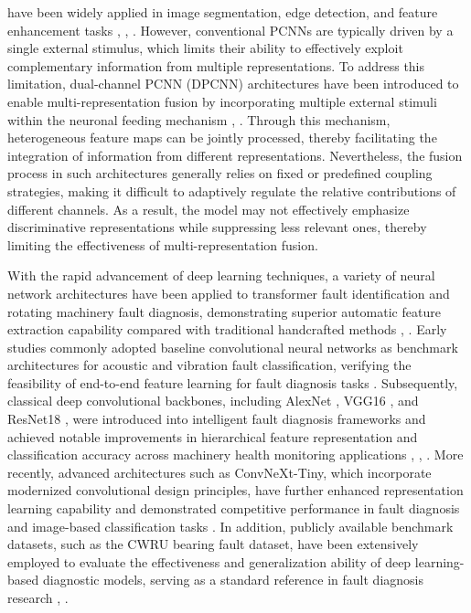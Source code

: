 \documentclass[journal]{IEEEtran}
\begin{document}
have been widely applied in image segmentation, edge detection, and feature enhancement tasks \cite{9444355}, \cite{10848019}, \cite{8746999}. However, conventional PCNNs are typically driven by a single external stimulus, which limits their ability to effectively exploit complementary information from multiple representations. To address this limitation, dual-channel PCNN (DPCNN) architectures have been introduced to enable multi-representation fusion by incorporating multiple external stimuli within the neuronal feeding mechanism \cite{4344292}, \cite{10341267}. Through this mechanism, heterogeneous feature maps can be jointly processed, thereby facilitating the integration of information from different representations. Nevertheless, the fusion process in such architectures generally relies on fixed or predefined coupling strategies, making it difficult to adaptively regulate the relative contributions of different channels. As a result, the model may not effectively emphasize discriminative representations while suppressing less relevant ones, thereby limiting the effectiveness of multi-representation fusion.

With the rapid advancement of deep learning techniques, a variety of neural network architectures have been applied to transformer fault identification and rotating machinery fault diagnosis, demonstrating superior automatic feature extraction capability compared with traditional handcrafted methods \cite{18184994}, \cite{7033433}. Early studies commonly adopted baseline convolutional neural networks as benchmark architectures for acoustic and vibration fault classification, verifying the feasibility of end-to-end feature learning for fault diagnosis tasks \cite{ahsanEnhancedFaultDiagnosis2025}. Subsequently, classical deep convolutional backbones, including AlexNet \cite{guNovelFaultDiagnosis2022}, VGG16 \cite{zhangFaultDiagnosisRecognition2024}, and ResNet18 \cite{maBearingFaultDiagnosis2024}, were introduced into intelligent fault diagnosis frameworks and achieved notable improvements in hierarchical feature representation and classification accuracy across machinery health monitoring applications \cite{11014495}, \cite{5352306}, \cite{4717246}. More recently, advanced architectures such as ConvNeXt-Tiny, which incorporate modernized convolutional design principles, have further enhanced representation learning capability and demonstrated competitive performance in fault diagnosis and image-based classification tasks \cite{zhangWaveConvNeXtEfficientPrecise2024}. In addition, publicly available benchmark datasets, such as the CWRU bearing fault dataset, have been extensively employed to evaluate the effectiveness and generalization ability of deep learning-based diagnostic models, serving as a standard reference in fault diagnosis research \cite{alonso-gonzalezBearingFaultDiagnosis2023}, \cite{zhangMachineLearningBased2021}.
\end{document}
